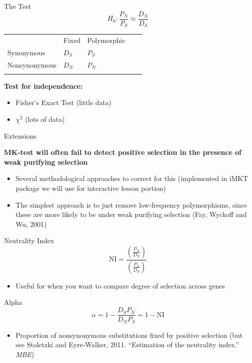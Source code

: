 \documentclass[compress]{beamer}
\begin{document}
\begin{frame}{The Test}
\centering
$$H_0: \frac{P_N}{P_S} \approx \frac{D_N}{D_S}$$
\begin{table}[]
\begin{tabular}{lllll}
\cline{2-3}
\multicolumn{1}{l|}{}               & \multicolumn{1}{l|}{Fixed} & \multicolumn{1}{l|}{Polymorphic} &  &  \\ \cline{1-3}
\multicolumn{1}{|l|}{Synonymous}    & \multicolumn{1}{l|}{$D_S$}         & \multicolumn{1}{l|}{$P_S$}         &  &  \\ \cline{1-3}
\multicolumn{1}{|l|}{Nonsynonymous} & \multicolumn{1}{l|}{$D_N$}         & \multicolumn{1}{l|}{$P_N$}         &  &  \\ \cline{1-3}
                                    &                                    &                                    &  & 
\end{tabular}
\end{table}


{\bf Test for independence:}
\begin{itemize}
\item Fisher's Exact Test (little data)
\item $\chi^2$ (lots of data)
\end{itemize}
\end{frame}

\begin{frame}{Extensions}

{\bf MK-test will often fail to detect positive selection in the presence of weak purifying selection}
\begin{itemize}
\item Several methodological approaches to correct for this (implemented in iMKT package we will use for interactive lesson portion)
\item The simplest approach is to just remove low-frequency polymorphisms, since these are more likely to be under weak purifying selection (Fay, Wyckoff and Wu, 2001)
\end{itemize}

\end{frame}

\begin{frame}{Neutrality Index}
$$\text{NI} = \frac{\left( \frac{P_N}{D_N} \right)}{\left( \frac{P_S}{D_S} \right)}$$
\begin{itemize}
\item Useful for when you want to compare degree of selection across genes
\end{itemize}
\end{frame}

\begin{frame}{Alpha}
$$\alpha = 1 - \frac{D_S P_N}{D_N P_S} = 1-\text{NI}$$
\begin{itemize}
\item Proportion of nonsynonymous substitutions fixed by positive selection (but see Stoletzki and Eyre-Walker, 2011. ``Estimation of the neutrality index.'' \emph{MBE})
\end{itemize}
\end{frame}
\end{document}
